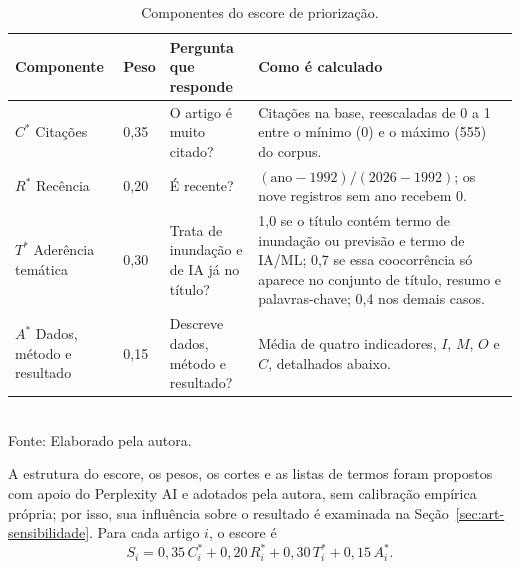 \begin{table}[!htb]
\centering
\caption{Componentes do escore de priorização.}
\label{tab:escore}
{\small
\renewcommand{\arraystretch}{1.2}
\begin{tabular}{@{}p{2.4cm}p{1cm}p{3.1cm}p{6.3cm}@{}}
\toprule
\textbf{Componente} & \textbf{Peso} & \textbf{Pergunta que responde} & \textbf{Como é calculado}\\
\midrule
$C^{*}$ Citações & 0,35 & O artigo é muito citado? & Citações na base, reescaladas de 0 a 1 entre o mínimo (0) e o máximo (555) do corpus.\\
$R^{*}$ Recência & 0,20 & É recente? & $(\text{ano}-1992)/(2026-1992)$; os nove registros sem ano recebem 0.\\
$T^{*}$ Aderência temática & 0,30 & Trata de inundação e de IA já no título? & 1,0 se o título contém termo de inundação ou previsão e termo de IA/ML; 0,7 se essa coocorrência só aparece no conjunto de título, resumo e palavras-chave; 0,4 nos demais casos.\\
$A^{*}$ Dados, método e resultado & 0,15 & Descreve dados, método e resultado? & Média de quatro indicadores, $I$, $M$, $O$ e $C$, detalhados abaixo.\\
\bottomrule
\end{tabular}}\\[2mm]
{\small Fonte: Elaborado pela autora.}
\end{table}

A estrutura do escore, os pesos, os cortes e as listas de termos foram propostos com apoio do Perplexity AI e adotados pela autora, sem calibração empírica própria; por isso, sua influência sobre o resultado é examinada na Seção~\ref{sec:art-sensibilidade}. Para cada artigo $i$, o escore é
%
\begin{equation}
S_i = 0{,}35\,C_i^{*} + 0{,}20\,R_i^{*} + 0{,}30\,T_i^{*} + 0{,}15\,A_i^{*}.
\label{eq:escore}
\end{equation}


